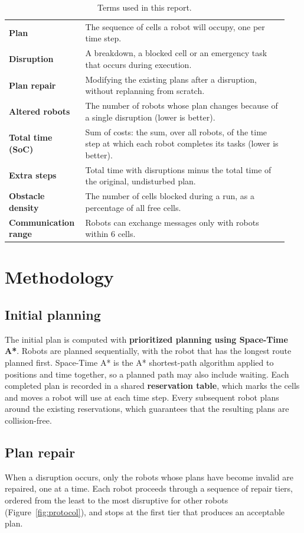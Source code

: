 \documentclass[11pt,a4paper]{article}
\begin{document}
\begin{table}[H]
\centering\small
\caption{Terms used in this report.}
\label{tab:terms}
\begin{tabular}{p{0.24\linewidth}p{0.70\linewidth}}
\toprule
\textbf{Plan} & The sequence of cells a robot will occupy, one per time step. \\
\textbf{Disruption} & A breakdown, a blocked cell or an emergency task that occurs during execution. \\
\textbf{Plan repair} & Modifying the existing plans after a disruption, without replanning from scratch. \\
\textbf{Altered robots} & The number of robots whose plan changes because of a single disruption (lower is better). \\
\textbf{Total time (SoC)} & Sum of costs: the sum, over all robots, of the time step at which each robot completes its tasks (lower is better). \\
\textbf{Extra steps} & Total time with disruptions minus the total time of the original, undisturbed plan. \\
\textbf{Obstacle density} & The number of cells blocked during a run, as a percentage of all free cells. \\
\textbf{Communication range} & Robots can exchange messages only with robots within 6 cells. \\
\bottomrule
\end{tabular}
\end{table}

\section{Methodology}
\subsection*{Initial planning}
The initial plan is computed with \textbf{prioritized planning using Space-Time A*}. Robots are
planned sequentially, with the robot that has the longest route planned first. Space-Time A* is
the A* shortest-path algorithm applied to positions and time together, so a planned path may also
include waiting. Each completed plan is recorded in a shared \textbf{reservation table}, which marks
the cells and moves a robot will use at each time step. Every subsequent robot plans around the
existing reservations, which guarantees that the resulting plans are collision-free.

\subsection*{Plan repair}
When a disruption occurs, only the robots whose plans have become invalid are repaired, one at a
time. Each robot proceeds through a sequence of repair tiers, ordered from the least to the most
disruptive for other robots (Figure~\ref{fig:protocol}), and stops at the first tier that
produces an acceptable plan.
\end{document}

